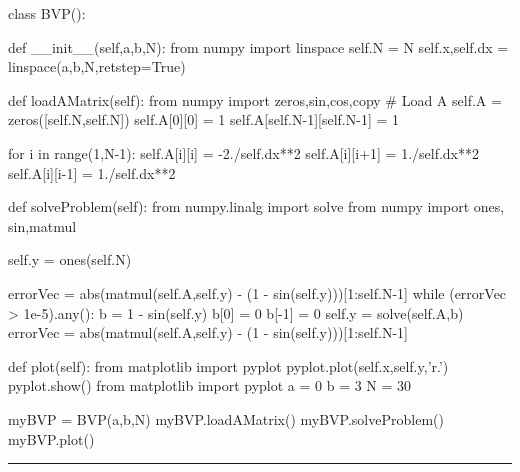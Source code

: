 \begin{codeexample}
\begin{VerbatimOut}{\listingFile}

class BVP():

    def __init__(self,a,b,N):
        from numpy import linspace
        self.N = N
        self.x,self.dx = linspace(a,b,N,retstep=True)


    def loadAMatrix(self):
        from numpy import zeros,sin,cos,copy
        # Load A
        self.A = zeros([self.N,self.N])
        self.A[0][0] = 1
        self.A[self.N-1][self.N-1] = 1


        for i in range(1,N-1):
            self.A[i][i] = -2./self.dx**2
            self.A[i][i+1] = 1./self.dx**2
            self.A[i][i-1] = 1./self.dx**2


    def solveProblem(self):
        from numpy.linalg import solve
        from numpy import ones, sin,matmul
        
        self.y = ones(self.N)

        errorVec = abs(matmul(self.A,self.y) - (1 - sin(self.y)))[1:self.N-1]
        while (errorVec > 1e-5).any():
            b = 1 - sin(self.y)
            b[0] = 0
            b[-1] = 0
            self.y = solve(self.A,b)
            errorVec = abs(matmul(self.A,self.y) - (1 - sin(self.y)))[1:self.N-1]
            
        
    def plot(self):
        from matplotlib import pyplot
        pyplot.plot(self.x,self.y,'r.')
        pyplot.show()
from matplotlib import pyplot
a = 0
b = 3
N = 30

myBVP = BVP(a,b,N)
myBVP.loadAMatrix()
myBVP.solveProblem()
myBVP.plot()

\end{VerbatimOut}
\end{codeexample}
\else
\noindent\rule{5 in}{0.01 in}
\fi


